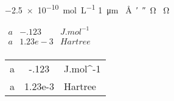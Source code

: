 \documentclass{article}
\begin{document}
\SI{-2.5e-10}{mol.L^{-1}}
\SI{1}{\micro\metre}
\SI{}{\angstrom\arcminute\arcsecond\ohm}
\vrule\SI{}{\ohm}\vrule

$\begin{array}{lSs}
  a&-.123 & J.mol^{-1} \\
  a&1.23e-3 & Hartree \\
 \end{array}$

\begin{tabular}{lSs}
  a&-.123 & J.mol^{-1} \\
  a&1.23e-3 & Hartree \\
\end{tabular}
\end{document}
